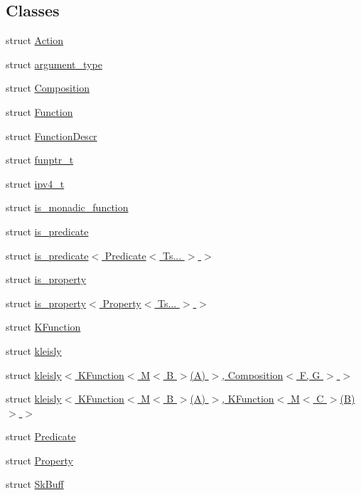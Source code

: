 \subsection*{Classes}
\begin{DoxyCompactItemize}
\item 
struct \hyperlink{structpfq_1_1lang_1_1Action}{Action}
\item 
struct \hyperlink{structpfq_1_1lang_1_1argument__type}{argument\+\_\+type}
\item 
struct \hyperlink{structpfq_1_1lang_1_1Composition}{Composition}
\item 
struct \hyperlink{structpfq_1_1lang_1_1Function}{Function}
\item 
struct \hyperlink{structpfq_1_1lang_1_1FunctionDescr}{Function\+Descr}
\item 
struct \hyperlink{structpfq_1_1lang_1_1funptr__t}{funptr\+\_\+t}
\item 
struct \hyperlink{structpfq_1_1lang_1_1ipv4__t}{ipv4\+\_\+t}
\item 
struct \hyperlink{structpfq_1_1lang_1_1is__monadic__function}{is\+\_\+monadic\+\_\+function}
\item 
struct \hyperlink{structpfq_1_1lang_1_1is__predicate}{is\+\_\+predicate}
\item 
struct \hyperlink{structpfq_1_1lang_1_1is__predicate_3_01Predicate_3_01Ts_8_8_8_01_4_01_4}{is\+\_\+predicate$<$ Predicate$<$ Ts... $>$ $>$}
\item 
struct \hyperlink{structpfq_1_1lang_1_1is__property}{is\+\_\+property}
\item 
struct \hyperlink{structpfq_1_1lang_1_1is__property_3_01Property_3_01Ts_8_8_8_01_4_01_4}{is\+\_\+property$<$ Property$<$ Ts... $>$ $>$}
\item 
struct \hyperlink{structpfq_1_1lang_1_1KFunction}{K\+Function}
\item 
struct \hyperlink{structpfq_1_1lang_1_1kleisly}{kleisly}
\item 
struct \hyperlink{structpfq_1_1lang_1_1kleisly_3_01KFunction_3_01M_3_01B_01_4_07A_08_01_4_00_01Composition_3_01F_00_01G_01_4_01_4}{kleisly$<$ K\+Function$<$ M$<$ B $>$(\+A) $>$, Composition$<$ F, G $>$ $>$}
\item 
struct \hyperlink{structpfq_1_1lang_1_1kleisly_3_01KFunction_3_01M_3_01B_01_4_07A_08_01_4_00_01KFunction_3_01M_3_01C_01_4_07B_08_4_01_4}{kleisly$<$ K\+Function$<$ M$<$ B $>$(\+A) $>$, K\+Function$<$ M$<$ C $>$(\+B)$>$ $>$}
\item 
struct \hyperlink{structpfq_1_1lang_1_1Predicate}{Predicate}
\item 
struct \hyperlink{structpfq_1_1lang_1_1Property}{Property}
\item 
struct \hyperlink{structpfq_1_1lang_1_1SkBuff}{Sk\+Buff}
\end{DoxyCompactItemize}
